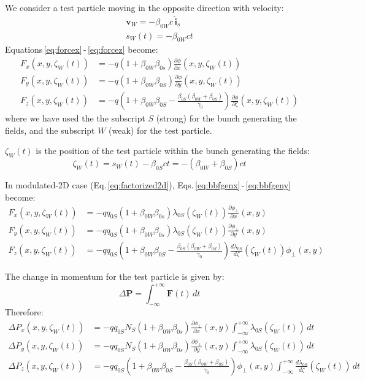 We consider a test particle moving in the opposite direction with velocity:
\begin{align}
\textbf{v}_W = -\beta_{0W} c\, \hat{\textbf{i}}_s\\
s_W(t) = -\beta_{0W} ct
\end{align}
Equations\,\eqref{eq:forcex}\,-\,\eqref{eq:forcez} become:
\begin{align}
F_x(x, y, \zeta_W(t)) &=  -q(1+\beta_{0W}  \beta_{0s}) \frac{\partial \phi}{\partial x}(x, y, \zeta_W(t)) \label{eq:bbfgenx}\\
F_y(x, y, \zeta_W(t)) &=  -q(1+\beta_{0W}  \beta_{0S}) \frac{\partial \phi}{\partial y}(x, y, \zeta_W(t))\label{eq:bbfgeny}\\
F_z(x, y, \zeta_W(t)) &=  -q\left(1+\beta_{0W}  \beta_{0S} -\frac{\beta_{0S}(\beta_{0W}+\beta_{0S})}{\gamma_0}\right) \frac{\partial \phi}{\partial \zeta}(x, y, \zeta_W(t))\label{eq:bbfgenz}
\end{align}
where we have used the the subscript $S$ (strong) for the bunch generating the fields, and the subscript $W$ (weak) for the test particle. 

$\zeta_W(t)$ is the position of the test particle within the bunch generating the fields: 
\begin{equation}
\zeta_W(t)= s_W(t) -\beta_{0S} c t  = -(\beta_{0W}+\beta_{0S})ct
\label{eq:zetaw}
\end{equation}

In modulated-2D case (Eq.\,\ref{eq:factorized2d}), Eqs.\,\eqref{eq:bbfgenx}\,-\,\eqref{eq:bbfgeny} become:
\begin{align}
F_x(x, y, \zeta_W(t)) &=  -q q_{0S} (1+\beta_{0W}  \beta_{0s})
\lambda_{0S}(\zeta_W(t))
 \frac{\partial \phi_\perp}{\partial x}(x, y ) \\
F_y(x, y, \zeta_W(t)) &=  -qq_{0S}  (1+\beta_{0W}  \beta_{0s})
\lambda_{0S}(\zeta_W(t))
 \frac{\partial \phi_\perp}{\partial y}(x, y ) \\
F_z(x, y, \zeta_W(t)) &=  -qq_{0S}\left(1+\beta_{0W}  \beta_{0S} -\frac{\beta_{0S}(\beta_{0W}+\beta_{0S})}{\gamma_0}\right) \frac{d \lambda_{0S}}{d \zeta}(\zeta_W(t)) \phi_\perp(x, y)
\end{align}

The change in momentum for the test particle is given by:
\begin{equation}
\Delta \textbf{P} = \int_{-\infty}^{+\infty} \textbf{F}(t) \,dt
\end{equation}
Therefore:
\begin{align}
\Delta P_x(x, y, \zeta_W(t)) &=  -qq_{0S} N_S (1+\beta_{0W}  \beta_{0s})
\frac{\partial \phi_\perp}{\partial x}(x, y ) \int_{-\infty}^{+\infty}\lambda_{0S}(\zeta_W(t)) \,dt\\
\Delta P_y(x, y, \zeta_W(t)) &=  -qq_{0S} N_S (1+\beta_{0W}  \beta_{0s})
 \frac{\partial \phi_\perp}{\partial y}(x, y ) \int_{-\infty}^{+\infty}\lambda_{0S}(\zeta_W(t)) \,dt\\
\Delta P_z(x, y, \zeta_W(t)) &=  -qq_{0S}\left(1+\beta_{0W}  \beta_{0S} -\frac{\beta_{0S}(\beta_{0W}+\beta_{0S})}{\gamma_0}\right) \phi_\perp(x, y) \int_{-\infty}^{+\infty}\frac{d \lambda_{0S}}{d \zeta}(\zeta_W(t)) \, dt
\end{align}


